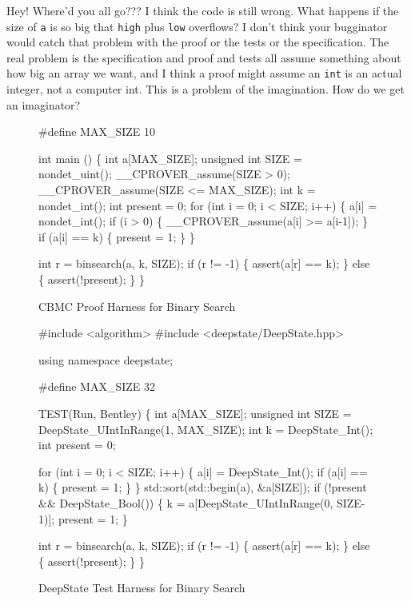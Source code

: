\documentclass[sigplan]{acmart}
\begin{document}
\vspace{0.1in}

  Hey!  Where'd you all go??? I think the code is still
wrong.  What happens if the size of {\tt a} is so big that {\tt high}
plus {\tt low} overflows?  I don't think your bugginator would catch
that problem with the proof or the tests or the specification.  The
real problem is the specification and proof and tests all assume
something about how big an array we want, and I think a proof might
assume an {\tt int} is an actual integer, not a computer int.  This is a problem
of the imagination.  How do we get an imaginator?


\begin{figure}
  {\scriptsize
  \begin{code}
\#define MAX\_SIZE 10

int main () \{
  int a[MAX\_SIZE];
  unsigned int SIZE = nondet\_uint();
  \_\_CPROVER\_assume(SIZE > 0);
  \_\_CPROVER\_assume(SIZE <= MAX\_SIZE);
  int k = nondet\_int();
  int present = 0;
  for (int i = 0; i < SIZE; i++) \{
    a[i] = nondet\_int();
    if (i > 0) \{
      \_\_CPROVER\_assume(a[i] >= a[i-1]);
    \}
    if (a[i] == k) \{
      present = 1;
    \}
  \}

  int r = binsearch(a, k, SIZE);
  if (r != -1) \{
    assert(a[r] == k);
  \} else \{
    assert(!present);
  \}
  \}
\end{code}
}
\caption{CBMC Proof Harness for Binary Search}
\label{fig:cbmc}
\end{figure}


\begin{figure}
{\scriptsize
  \begin{code}
\#include <algorithm>
\#include <deepstate/DeepState.hpp>

using namespace deepstate;

\#define MAX\_SIZE 32

TEST(Run, Bentley) \{
  int a[MAX\_SIZE];
  unsigned int SIZE = DeepState\_UIntInRange(1, MAX\_SIZE);
  int k = DeepState\_Int();
  int present = 0;

  for (int i = 0; i < SIZE; i++) \{
    a[i] = DeepState\_Int();
    if (a[i] == k) \{
      present = 1;
    \}
  \}
  std::sort(std::begin(a), \&a[SIZE]);
  if (!present \&\& DeepState\_Bool()) \{
    k = a[DeepState\_UIntInRange(0, SIZE-1)];
    present = 1;
  \}

  int r = binsearch(a, k, SIZE);
  if (r != -1) \{
    assert(a[r] == k);
  \} else \{
    assert(!present);
  \}
\}
\end{code}
}
\caption{DeepState Test Harness for Binary Search}
\label{fig:deepstate}
\end{figure}
\end{document}
